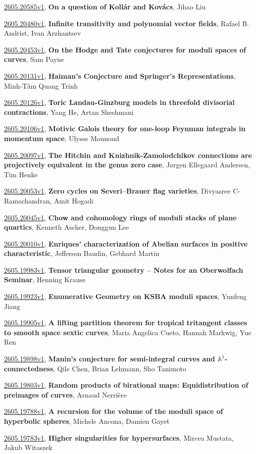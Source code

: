 \documentclass[9pt, a4paper]{article}
\theoremstyle{plain}
\theoremstyle{definition}
\theoremstyle{remark}
\newcommand{\arxiv}[3]{\href{https://arxiv.org/abs/#1}{#1}, \textbf{\textcolor{arxivblue}{#2}}, #3}
\begin{document}
\arxiv{2605.20585v1}{On a question of Kollár and Kovács}{Jihao Liu}

\arxiv{2605.20480v1}{Infinite transitivity and polynomial vector fields}{Rafael B. Andrist, Ivan Arzhantsev}

\arxiv{2605.20453v1}{On the Hodge and Tate conjectures for moduli spaces of curves}{Sam Payne}

\arxiv{2605.20131v1}{Haiman's Conjecture and Springer's Representations}{Minh-Tâm Quang Trinh}

\arxiv{2605.20126v1}{Toric Landau-Ginzburg models in threefold divisorial contractions}{Yang He, Artan Sheshmani}

\arxiv{2605.20106v1}{Motivic Galois theory for one-loop Feynman integrals in momentum space}{Ulysse Mounoud}

\arxiv{2605.20097v1}{The Hitchin and Knizhnik-Zamolodchikov connections are projectively equivalent in the genus zero case}{Jørgen Ellegaard Andersen, Tim Henke}

\arxiv{2605.20053v1}{Zero cycles on Severi--Brauer flag varieties}{Divyasree C-Ramachandran, Amit Hogadi}

\arxiv{2605.20045v1}{Chow and cohomology rings of moduli stacks of plane quartics}{Kenneth Ascher, Donggun Lee}

\arxiv{2605.20010v1}{Enriques' characterization of Abelian surfaces in positive characteristic}{Jefferson Baudin, Gebhard Martin}

\arxiv{2605.19983v1}{Tensor triangular geometry -- Notes for an Oberwolfach Seminar}{Henning Krause}

\arxiv{2605.19923v1}{Enumerative Geometry on KSBA moduli spaces}{Yunfeng Jiang}

\arxiv{2605.19905v1}{A lifting partition theorem for tropical tritangent classes to smooth space sextic curves}{Maria Angelica Cueto, Hannah Markwig, Yue Ren}

\arxiv{2605.19898v1}{Manin's conjecture for semi-integral curves and $\mathbb A^1$-connectedness}{Qile Chen, Brian Lehmann, Sho Tanimoto}

\arxiv{2605.19803v1}{Random products of birational maps: Equidistribution of preimages of curves}{Arnaud Nerrière}

\arxiv{2605.19788v1}{A recursion for the volume of the moduli space of hyperbolic spheres}{Michele Ancona, Damien Gayet}

\arxiv{2605.19783v1}{Higher singularities for hypersurfaces}{Mircea Mustata, Jakub Witaszek}
\end{document}
